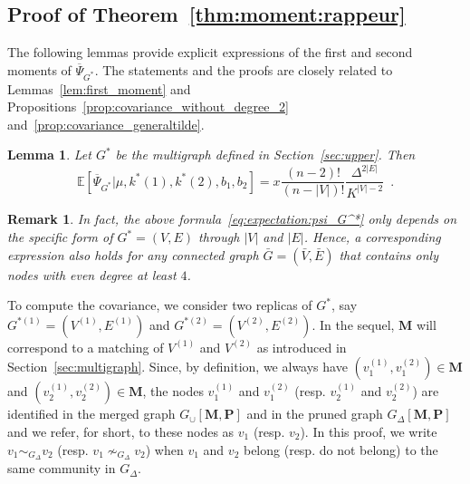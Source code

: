 \documentclass{article}
\newtheorem{lemma}{Lemma}
\newtheorem{remark}{Remark}
\begin{document}
\subsection{Proof of Theorem~\ref{thm:moment:rappeur}}
The following lemmas provide explicit expressions of the first and second moments of $\overline{\Psi}_{G^*}$. The statements and the proofs are closely related to Lemmas~\ref{lem:first_moment} and  Propositions~\ref{prop:covariance_without_degree_2} and~\ref{prop:covariance_generaltilde}.
\begin{lemma}
    \label{lem:upper_boundexpectation}
        Let $G^*$ be the multigraph defined in Section~\ref{sec:upper}. Then
      \begin{equation}\label{eq:expectation:psi_G^*}
            \mathbb{E}\left[\overline{\Psi}_{G^*}|\mu, k^*(1),k^*(2),b_1,b_2\right]= x \frac{(n-2)!}{(n-|V|)!} \frac{\Delta^{2|E|}}{K^{|V|-2}} \enspace . 
      \end{equation}
    \end{lemma}
\begin{remark}\label{remark:expection:G}
In fact, the above formula~\eqref{eq:expectation:psi_G^*} only depends on the specific form of $G^*=(V,E)$ through $|V|$ and $|E|$. Hence, a corresponding expression also holds for any connected graph $\bar{G}=(\bar{V},\bar{E})$ that contains only nodes with even degree at least $4$. 
\end{remark}



To compute the covariance, we consider two replicas of $G^*$, say $G^{*(1)}=(V^{(1)},E^{(1)})$ and $G^{*(2)}=(V^{(2)},E^{(2)})$. In the sequel, $\mathbf{M}$ will correspond to a matching of $V^{(1)}$ and $V^{(2)}$ as introduced in Section~\ref{sec:multigraph}. Since, by definition,  we always have $(v_1^{(1)}, v_1^{(2)})\in \mathbf{M}$ and $(v_2^{(1)}, v_2^{(2)})\in \mathbf{M}$, the nodes $v_1^{(1)}$ and  $v_1^{(2)}$ (resp. $v_2^{(1)}$ and  $v_2^{(2)}$) are identified in the merged graph $G_{\cup}[\mathbf{M},\mathbf{P}]$ and in the pruned graph $G_{\Delta}[\mathbf{M},\mathbf{P}]$ and we refer, for short, to these nodes as $v_1$ (resp. $v_2$). In this proof, we write $v_1 \sim_{G_\Delta} v_2$  (resp. $v_1 \nsim_{G_\Delta} v_2$) when $v_1$ and $v_2$ belong (resp. do not belong) to the same community in $G_{\Delta}$. 
\end{document}

